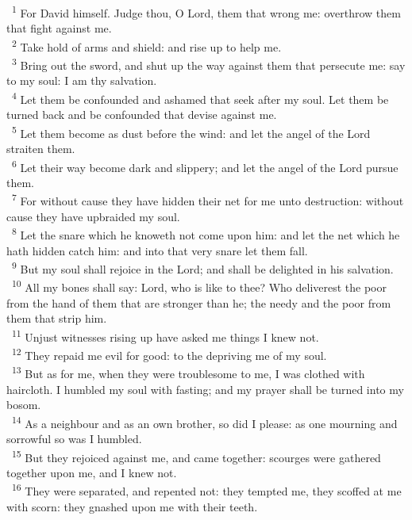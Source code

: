 \documentclass[a5paper,12pt]{article}
\begin{document}
\begin{multicols*}{2}
~\textsuperscript{1} For David himself. Judge thou, O Lord, them that wrong me: overthrow them that fight against me.\\
~\textsuperscript{2} Take hold of arms and shield: and rise up to help me.\\
~\textsuperscript{3} Bring out the sword, and shut up the way against them that persecute me: say to my soul: I am thy salvation.\\
~\textsuperscript{4} Let them be confounded and ashamed that seek after my soul. Let them be turned back and be confounded that devise against me.\\
~\textsuperscript{5} Let them become as dust before the wind: and let the angel of the Lord straiten them.\\
~\textsuperscript{6} Let their way become dark and slippery; and let the angel of the Lord pursue them.\\
~\textsuperscript{7} For without cause they have hidden their net for me unto destruction: without cause they have upbraided my soul.\\
~\textsuperscript{8} Let the snare which he knoweth not come upon him: and let the net which he hath hidden catch him: and into that very snare let them fall.\\
~\textsuperscript{9} But my soul shall rejoice in the Lord; and shall be delighted in his salvation.\\
~\textsuperscript{10} All my bones shall say: Lord, who is like to thee? Who deliverest the poor from the hand of them that are stronger than he; the needy and the poor from them that strip him.\\
~\textsuperscript{11} Unjust witnesses rising up have asked me things I knew not.\\
~\textsuperscript{12} They repaid me evil for good: to the depriving me of my soul.\\
~\textsuperscript{13} But as for me, when they were troublesome to me, I was clothed with haircloth. I humbled my soul with fasting; and my prayer shall be turned into my bosom.\\
~\textsuperscript{14} As a neighbour and as an own brother, so did I please: as one mourning and sorrowful so was I humbled.\\
~\textsuperscript{15} But they rejoiced against me, and came together: scourges were gathered together upon me, and I knew not.\\
~\textsuperscript{16} They were separated, and repented not: they tempted me, they scoffed at me with scorn: they gnashed upon me with their teeth.\\

\end{multicols*}
\end{document}
